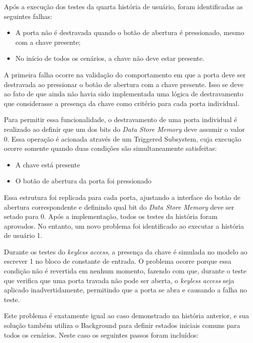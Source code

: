 Após a execução dos testes da quarta história de usuário, foram identificadas as seguintes falhas:

\begin{itemize}
	\item A porta não é destravada quando o botão de abertura é pressionado, mesmo com a chave presente;
	\item No início de todos os cenários, a chave não deve estar presente.
\end{itemize}

A primeira falha ocorre na validação do comportamento em que a porta deve ser destravada ao pressionar o botão de abertura com a chave presente. Isso se deve ao fato 
de que ainda não havia sido implementada uma lógica de destravamento que considerasse a presença da chave como critério para cada porta individual.

Para permitir essa funcionalidade, o destravamento de uma porta individual é realizado ao definir que um dos bits do \textit{Data Store Memory} deve assumir o valor 0. 
Essa operação é acionada através de um Triggered Subsystem, cuja execução ocorre somente quando duas condições são simultaneamente satisfeitas:

\begin{itemize}
	\item A chave está presente
	\item O botão de abertura da porta foi pressionado
\end{itemize}

Essa estrutura foi replicada para cada porta, ajustando a interface do botão de abertura correspondente e definindo qual bit do \textit{Data Store Memory} deve ser setado 
para 0. Após a implementação, todos os testes da história foram aprovados. No entanto, um novo problema foi identificado ao executar a história de usuário 1.

Durante os testes do \textit{keyless access}, a presença da chave é simulada no modelo ao escrever 1 no bloco de constante de entrada. O problema ocorre porque essa 
condição não é revertida em nenhum momento, fazendo com que, durante o teste que verifica que uma porta travada não pode ser aberta, o \textit{keyless access} seja 
aplicado inadvertidamente, permitindo que a porta se abra e causando a falha no teste.

Este problema é exatamente igual ao caso demonstrado na história anterior, e sua solução também utiliza o Background para definir estados iniciais comuns para todos 
os cenários. Neste caso os seguintes passos foram incluídos:

